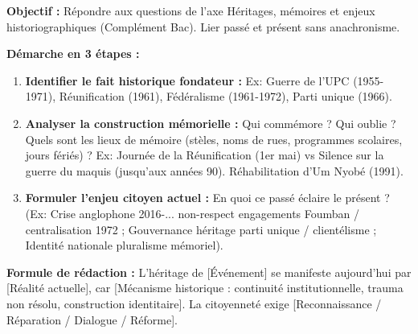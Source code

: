 \documentclass[11pt]{article}
\newcommand{\cle}[1]{{\popxbold\color{popdark}#1}}
\begin{document}
\begin{methode}
\textbf{Objectif :} Répondre aux questions de l'axe \guillemotleft Héritages, mémoires et enjeux historiographiques \guillemotright (Complément Bac). Lier passé et présent sans anachronisme.\par
\textbf{Démarche en 3 étapes :}
\begin{enumerate}
    \item \textbf{Identifier le fait historique fondateur :} Ex: Guerre de l'UPC (1955-1971), Réunification (1961), Fédéralisme (1961-1972), Parti unique (1966).
    \item \textbf{Analyser la construction mémorielle :} Qui commémore ? Qui oublie ? Quels sont les \cle{lieux de mémoire} (stèles, noms de rues, programmes scolaires, jours fériés) ? Ex: \cle{Journée de la Réunification (1er mai)} vs \cle{Silence sur la guerre du maquis} (jusqu'aux années 90). \cle{Réhabilitation d'Um Nyobé (1991)}.
    \item \textbf{Formuler l'enjeu citoyen actuel :} En quoi ce passé éclaire le présent ? (Ex: Crise anglophone 2016-... \leftarrow non-respect engagements Foumban / centralisation 1972 ; Gouvernance \leftarrow héritage parti unique / clientélisme ; Identité nationale \leftarrow pluralisme mémoriel).
\end{enumerate}
\textbf{Formule de rédaction :} \guillemotleft L'héritage de [Événement] se manifeste aujourd'hui par [Réalité actuelle], car [Mécanisme historique : continuité institutionnelle, trauma non résolu, construction identitaire]. La citoyenneté exige [Reconnaissance / Réparation / Dialogue / Réforme]. \guillemotright
\end{methode}
\end{document}
